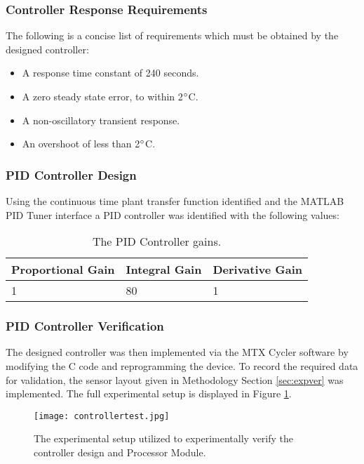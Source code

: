\subsubsection{Controller Response Requirements}
The following is a concise list of requirements which must be obtained by the designed controller:
\begin{itemize}
	\item A response time constant of 240 seconds.
	\item A zero steady state error, to within 2$\degree$C.
	\item A non-oscillatory transient response.
	\item An overshoot of less than 2$\degree$C.
\end{itemize}

\subsubsection{PID Controller Design}

Using the continuous time plant transfer function identified and the MATLAB PID Tuner interface a PID controller was identified with the following values:

\begin{table}[h!]
	\begin{center}
		\begin{tabular}{ | p{4cm} |  p{4cm} | p{4cm} | }
			\hline
			Proportional Gain & Integral Gain & Derivative Gain \\ \hline
			1 & 80 & 1 \\ \hline
		\end{tabular}
	\end{center}
	\caption[PID Controller Gains.]{The PID Controller gains.}
	\label{tab:PIDgains}
\end{table}

\subsubsection{PID Controller Verification}
\label{sec:controller_verification}

The designed controller was then implemented via the MTX Cycler software by modifying the C code and reprogramming the device. To record the required data for validation, the sensor layout given in Methodology Section \ref{sec:expver} was implemented. The full experimental setup is displayed in Figure \ref{fig:controllertest]}.

\begin{figure}[!htb]
	\centering
	\texttt{[image: controllertest.jpg]}
	\caption[Controller Verification Experimental Setup.]{The experimental setup utilized to experimentally verify the controller design and Processor Module.}
	\label{fig:controllertest]}
\end{figure} 
\FloatBarrier

